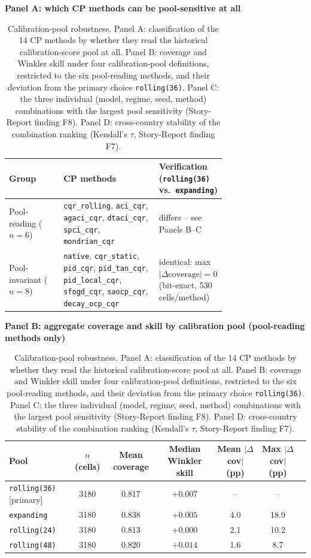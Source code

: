 \begin{table}[t]
\centering
\caption{Calibration-pool robustness. Panel A: classification of the 14 CP methods by whether they read the historical calibration-score pool at all. Panel B: coverage and Winkler skill under four calibration-pool definitions, restricted to the six pool-reading methods, and their deviation from the primary choice \texttt{rolling(36)}. Panel C: the three individual (model, regime, seed, method) combinations with the largest pool sensitivity (Story-Report finding F8). Panel D: cross-country stability of the combination ranking (Kendall's $\tau$, Story-Report finding F7).}
\label{tab:res_robustness_pool}

\textbf{Panel A: which CP methods can be pool-sensitive at all}\\[1mm]
\begin{tabular}{l p{0.44\linewidth} p{0.28\linewidth}}
\toprule
Group & CP methods & Verification (\texttt{rolling(36)} vs.\ \texttt{expanding}) \\
\midrule
Pool-reading ($n=6$) & \texttt{cqr\_rolling}, \texttt{aci\_cqr}, \texttt{agaci\_cqr}, \texttt{dtaci\_cqr}, \texttt{spci\_cqr}, \texttt{mondrian\_cqr} & differs -- see Panels B--C \\
\addlinespace
Pool-invariant ($n=8$) & \texttt{native}, \texttt{cqr\_static}, \texttt{pid\_cqr}, \texttt{pid\_tan\_cqr}, \texttt{pid\_local\_cqr}, \texttt{sfogd\_cqr}, \texttt{saocp\_cqr}, \texttt{decay\_ocp\_cqr} & identical: max $|\Delta\text{coverage}| = 0$ (bit-exact, 530 cells/method) \\
\bottomrule
\end{tabular}

\vspace{3mm}
\textbf{Panel B: aggregate coverage and skill by calibration pool (pool-reading methods only)}\\[1mm]
\begin{tabular}{lcccccc}
\toprule
Pool & $n$ (cells) & Mean coverage & Median Winkler skill & Mean $|\Delta$cov$|$ (pp) & Max $|\Delta$cov$|$ (pp) \\
\midrule
\texttt{rolling(36)} [primary] & 3180 & 0.817 & $+0.007$ & -- & -- \\
\texttt{expanding}             & 3180 & 0.838 & $+0.005$ & 4.0  & 18.9 \\
\texttt{rolling(24)}           & 3180 & 0.813 & $+0.000$ & 2.1  & 10.2 \\
\texttt{rolling(48)}           & 3180 & 0.820 & $+0.014$ & 1.6  & 8.7  \\
\bottomrule
\end{tabular}


\end{table}

